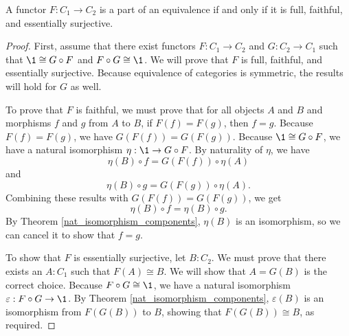 \documentclass[../../math.tex]{subfiles}
\begin{document}
\begin{theorem}
    A functor $F : C_1 \to C_2$ is a part of an equivalence if and only if it is
    full, faithful, and essentially surjective.
\end{theorem}
\begin{proof}
    First, assume that there exist functors $F : C_1 \to C_2$ and $G : C_2 \to
    C_1$ such that $\1 \cong G \circ F$ and $F \circ G \cong \1$.  We will prove
    that $F$ is full, faithful, and essentially surjective.  Because equivalence
    of categories is symmetric, the results will hold for $G$ as well.

    To prove that $F$ is faithful, we must prove that for all objects $A$ and
    $B$ and morphisms $f$ and $g$ from $A$ to $B$, if $F(f) = F(g)$, then $f =
    g$.  Because $F(f) = F(g)$, we have $G(F(f)) = G(F(g))$.  Because $\1 \cong
    G \circ F$, we have a natural isomorphism $\eta : \1 \to G \circ F$.  By
    naturality of $\eta$, we have
    \[
        \eta(B) \circ f = G(F(f)) \circ \eta(A)
    \]
    and
    \[
        \eta(B) \circ g = G(F(g)) \circ \eta(A).
    \]
    Combining these results with $G(F(f)) = G(F(g))$, we get
    \[
        \eta(B) \circ f = \eta(B) \circ g.
    \]
    By Theorem \ref{nat_isomorphism_components}, $\eta(B)$ is an isomorphism, so
    we can cancel it to show that $f = g$.

    To show that $F$ is essentially surjective, let $B : C_2$.  We must prove
    that there exists an $A : C_1$ such that $F(A) \cong B$.  We will show that
    $A = G(B)$ is the correct choice.  Because $F \circ G \cong \1$, we have a
    natural isomorphism $\varepsilon : F \circ G \to \1$.  By Theorem
    \ref{nat_isomorphism_components}, $\varepsilon(B)$ is an isomorphism from
    $F(G(B))$ to $B$, showing that $F(G(B)) \cong B$, as required.


\end{proof}
\end{document}
